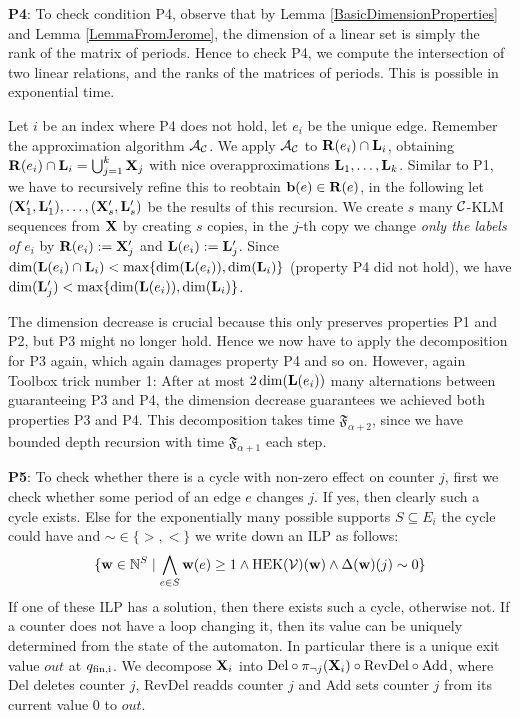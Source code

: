 \textbf{P4}: To check condition P4, observe that by Lemma \ref{BasicDimensionProperties} and Lemma \ref{LemmaFromJerome}, the dimension of a linear set is simply the rank of the matrix of periods. Hence to check P4, we compute the intersection of two linear relations, and the ranks of the matrices of periods. This is possible in exponential time. 

Let \(i\) be an index where P4 does not hold, let \(e_i\) be the unique edge. Remember the approximation algorithm \(\mathcal{A}_{\mathcal{C}}\). We apply \(\mathcal{A}_{\mathcal{C}}\) to \(\mathbf{R}(e_i) \cap \mathbf{L}_i\), obtaining \(\mathbf{R}(e_i) \cap \mathbf{L}_i=\bigcup_{j=1}^k \mathbf{X}_j\) with nice overapproximations \(\mathbf{L}_1, \dots, \mathbf{L}_k\). Similar to P1, we have to recursively refine this to reobtain \(\mathbf{b}(e) \in \mathbf{R}(e)\), in the following let \((\mathbf{X}_1', \mathbf{L}_1'), \dots, (\mathbf{X}_s', \mathbf{L}_s')\) be the results of this recursion. We create \(s\) many \(\mathcal{C}\)-KLM sequences from \(\mathbf{X}\) by creating \(s\) copies, in the \(j\)-th copy we change \emph{only the labels of} \(e_i\) by \(\mathbf{R}(e_i):=\mathbf{X}_j'\) and \(\mathbf{L}(e_i):=\mathbf{L}_j'\). Since \(\dim(\mathbf{L}(e_i) \cap \mathbf{L}_i)<\max \{\dim(\mathbf{L}(e_i)), \dim(\mathbf{L}_i)\}\) (property P4 did not hold), we have \(\dim(\mathbf{L}_j')< \max \{\dim(\mathbf{L}(e_i)), \dim(\mathbf{L}_i)\}\). 

The dimension decrease is crucial because this only preserves properties P1 and P2, but P3 might no longer hold. Hence we now have to apply the decomposition for P3 again, which again damages property P4 and so on. However, again Toolbox trick number 1: After at most \(2\dim(\mathbf{L}(e_i))\) many alternations between guaranteeing P3 and P4, the dimension decrease guarantees we achieved both properties P3 and P4. This decomposition takes time \(\mathfrak{F}_{\alpha+2}\), since we have bounded depth recursion with time \(\mathfrak{F}_{\alpha+1}\) each step.

\textbf{P5}: To check whether there is a cycle with non-zero effect on counter \(j\), first we check whether some period of an edge \(e\) changes \(j\). If yes, then clearly such a cycle exists. Else for the exponentially many possible supports \(S \subseteq E_i\) the cycle could have and \(\sim \in \{>,<\}\)  we write down an ILP as follows: 
\[\{\mathbf{w}\in \mathbb{N}^{S} \mid \bigwedge_{e \in S} \mathbf{w}(e)\geq 1 \wedge \text{HEK}(\operatorname{\mathcal{V}})(\mathbf{w})\wedge \Delta(\mathbf{w})(j) \sim 0\}\]
If one of these ILP has a solution, then there exists such a cycle, otherwise not. If a counter does not have a loop changing it, then its value can be uniquely determined from the state of the automaton. In particular there is a unique exit value \(out\) at \(q_{\text{fin,i}}\). We decompose \(\mathbf{X}_i\) into \(\text{Del} \circ \pi_{\neg j}(\mathbf{X}_i) \circ \text{RevDel} \circ \text{Add}\), where Del deletes counter \(j\), RevDel readds counter \(j\) and Add sets counter \(j\) from its current value \(0\) to \(out\).

